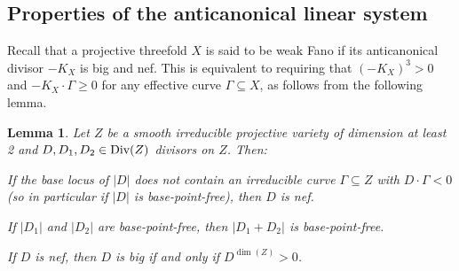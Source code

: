 \documentclass[english,11pt,reqno]{amsart}
\newcommand{\sub}{\subseteq}
\newcommand{\Div}{\textup{Div}}
\newtheorem{lem}[thm]{Lemma}
\begin{document}
\subsection{Properties of the anticanonical linear system} \label{subsection:blowups}

%
Recall that a projective threefold $X$ is said to be weak Fano if its anticanonical divisor $-K_X$ is big and nef. This is equivalent to requiring that $(-K_X)^3>0$ and $-K_X\cdot \Gamma \geq 0$ for any effective curve $\Gamma \sub X$, as follows from the following lemma.
%
\begin{lem} 
Let $Z$ be a smooth irreducible projective variety of dimension at least 2 and $D,D_1,D_2\in \Div(Z)$ divisors on $Z$. Then:
\begin{enumlem}
\item If the base locus of $|D|$ does not contain an irreducible curve $\Gamma \sub Z$ with $D\cdot \Gamma<0$ (so in particular if $|D|$ is base-point-free), then $D$ is nef. \label{lem:base_point_free_implies_nef}
\item If $|D_1|$ and $|D_2|$ are base-point-free, then $|D_1+D_2|$ is base-point-free. \label{lem:sum_of_base_point_free_linear_systems}
\item If $D$ is nef, then $D$ is big if and only if $D^{\dim(Z)}>0$. \label{lem:nef_implies_big_iff_top_intersection_positive}
\end{enumlem}
\end{lem}
\end{document}
